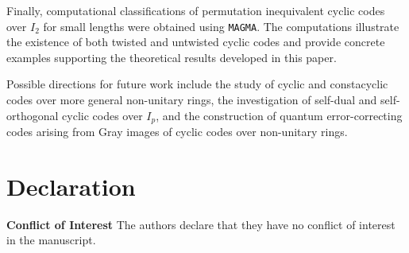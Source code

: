 \documentclass[12pt]{article}
\theoremstyle{definition}
\theoremstyle{plain}
\begin{document}
Finally, computational classifications of permutation inequivalent cyclic codes over $I_2$ for small lengths were obtained using \texttt{MAGMA}. The computations illustrate the existence of both twisted and untwisted cyclic codes and provide concrete examples supporting the theoretical results developed in this paper.

Possible directions for future work include the study of cyclic and constacyclic codes over more general non-unitary rings, the investigation of self-dual and self-orthogonal cyclic codes over $I_p$, and the construction of quantum error-correcting codes arising from Gray images of cyclic codes over non-unitary rings.



\section*{Declaration}
\textbf{Conflict of Interest} The authors declare that they have no conflict of interest in the manuscript.
\end{document}
